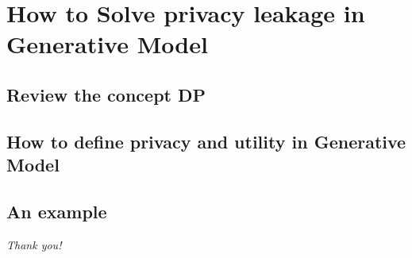 \documentclass{beamer}
\begin{document}
\section{How to Solve privacy leakage in Generative Model}
\subsection{Review the concept DP}
\begin{frame}
    
\end{frame}
\subsection{How to define privacy and utility in Generative Model}
\begin{frame}
    
\end{frame}
\subsection{An example}
\begin{frame}
    
\end{frame}




\begin{frame}{}
  \centering \Large
  \emph{Thank you!}
\end{frame}
\end{document}

